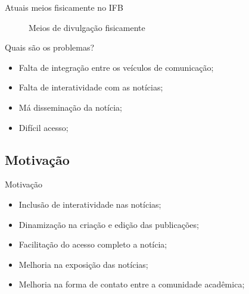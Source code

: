 \documentclass{aula-ifb}
\begin{document}
\begin{frame}{Atuais meios fisicamente no IFB}
\begin{figure}[h]
  \centering
  \quad %
  \caption{Meios de divulgação fisicamente}
\label{fig1}
\end{figure}
\end{frame}

\begin{frame}{Quais são os problemas?}
\begin{itemize}
   \item Falta de integração entre os veículos de comunicação;
   \vspace{10px}
   \item Falta de interatividade com as notícias;
   \vspace{10px}
   \item Má disseminação da notícia;
   \vspace{10px}
   \item Difícil acesso;
\end{itemize}	 
\end{frame}

\subsection{Motivação}
\begin{frame}{Motivação}
	\begin{itemize}
		\item Inclusão de interatividade nas notícias;
		\vspace{10px}		
		\item Dinamização na criação e edição das publicações;
		\vspace{10px}		
		\item Facilitação do acesso completo a notícia;
		\vspace{10px}
		\item Melhoria na exposição das notícias;
		\vspace{10px}
		\item Melhoria na forma de contato entre a comunidade acadêmica;
	\end{itemize}
\end{frame}
\end{document}
